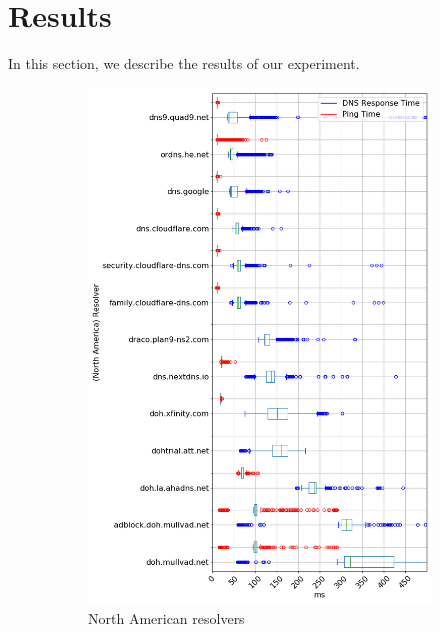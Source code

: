 \section{Results}\label{sec:results}
In this section, we describe the results of our experiment. 

\begin{figure}[t!]
    \centering
    \begin{subfigure}[t]{0.5\textwidth}
        \centering
        \includegraphics[width=\linewidth]{figures/Ohio_North_America.png}
        \caption{North American resolvers}
    \end{subfigure}%
    ~ 
    \begin{subfigure}[t]{0.5\textwidth}
        \centering

\end{subfigure}
\end{figure}
